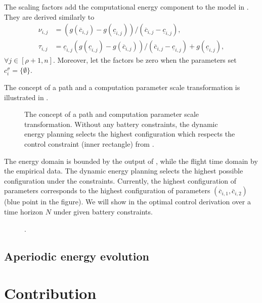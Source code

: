 The scaling factors add the computational energy component to the model in . They are derived similarly to 
\begin{subequations}\label{eq:scale-comp}\begin{align}
  \nu_{i,j}&=(g(\overline{c}_{i,j})-g(\underline{c}_{i,j}))/(\overline{c}_{i,j}-\underline{c}_{i,j}),\\
  \tau_{i,j}&=\underline{c}_{i,j}(g(\underline{c}_{i,j})-g(\overline{c}_{i,j}))/(\overline{c}_{i,j}-\underline{c}_{i,j})+g(\underline{c}_{i,j}),
\end{align}\end{subequations}
$\forall j\in[\rho+1,n]$. Moreover, let the factors be zero when the parameters set $c_i^\sigma=\{\emptyset\}$.

The concept of a path and a computation parameter scale transformation is illustrated in . 
\begin{figure}[h]
  \centering
  \selectfont
  
  \caption[Concept of a path and computation parameter scale transformation]{The concept of a path and computation parameter scale transformation. Without any battery constraints, the dynamic energy planning selects the highest configuration which respects the control constraint (inner rectangle) from .}
  \label{fig:plot-6}
\end{figure}
The energy domain is bounded by the output of \powprof{}, while the flight time domain by the empirical data. The dynamic energy planning selects the highest possible configuration under the constraints. Currently, the highest configuration of parameters corresponds to the highest configuration of parameters $(\overline{c}_{i,1},\overline{c}_{i,2})$ (blue point in the figure). We will show in  the optimal control derivation over a time horizon $N$ under given battery constraints.
\begin{figure}[h]
  \centering
  \selectfont
  
  \caption[.]{.}
  \label{fig:plot-7}
\end{figure}

\subsection{\color{red}Aperiodic energy evolution}
\label{sec:non-perio}

\section{\color{red}Contribution}


